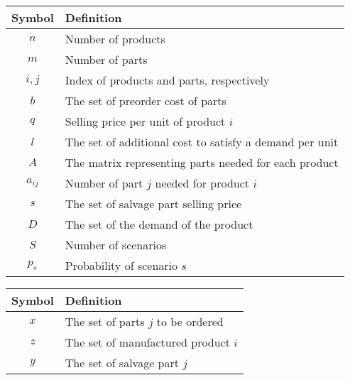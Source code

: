 		\begin{center}
		\begin{tabular}{|c|l|}
		\hline
		\textbf{Symbol} & \textbf{Definition}\\
		\hline 
		\multirow{1}{*}{$n$} & \multirow{1}{*}{Number of products}\\
		\hline
		\multirow{1}{*}{$m$} & \multirow{1}{*}{Number of parts}\\
		\hline
		\multirow{1}{*}{$i, j$} & \multirow{1}{*}{Index of products and parts, respectively}\\
		\hline
		\multirow{1}{*}{$b$} & \multirow{1}{*}{The set of preorder cost of parts}\\
		\hline
		\multirow{1}{*}{$q$} & \multirow{1}{*}{Selling price per unit of product $i$}\\
		\hline
		\multirow{1}{*}{$l$} & \multirow{1}{*}{The set of additional cost to satisfy a demand per unit}\\
		\hline
		\multirow{1}{*}{$A$} & \multirow{1}{*}{The matrix representing parts needed for each product}\\
		\hline
		\multirow{1}{*}{$a_{ij}$} & \multirow{1}{*}{Number of part $j$ needed for product $i$}\\
		\hline
		\multirow{1}{*}{$s$} & \multirow{1}{*}{The set of salvage part selling price}\\
		\hline
		\multirow{1}{*}{$D$} & \multirow{1}{*}{The set of the demand of the product}\\
		\hline
		\multirow{1}{*}{$S$} & \multirow{1}{*}{Number of scenarios}\\
		\hline
		\multirow{1}{*}{$p_s$} & \multirow{1}{*}{Probability of scenario $s$}\\
		\hline
		\end{tabular}
		\end{center}

		\begin{center}
		\begin{tabular}{|c|l|}
		\hline
		\textbf{Symbol} & \textbf{Definition}\\
		\hline 
		\multirow{1}{*}{$x$} & \multirow{1}{*}{The set of parts $j$ to be ordered}\\
		\hline
		\multirow{1}{*}{$z$} & \multirow{1}{*}{The set of manufactured product $i$}\\
		\hline
		\multirow{1}{*}{$y$} & \multirow{1}{*}{The set of salvage part $j$}\\
		\hline
		\end{tabular}
		\end{center}

